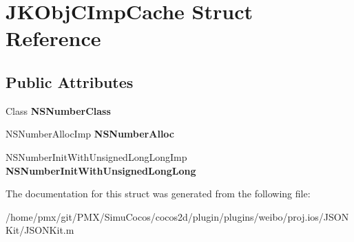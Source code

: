 \hypertarget{structJKObjCImpCache}{}\section{J\+K\+Obj\+C\+Imp\+Cache Struct Reference}
\label{structJKObjCImpCache}
\subsection*{Public Attributes}
\begin{DoxyCompactItemize}
\item 
\mbox{\label{structJKObjCImpCache_a2acfa5579ae2ce93cc41b3370622aac5}} 
Class {\bfseries N\+S\+Number\+Class}
\item 
\mbox{\label{structJKObjCImpCache_a2c83a6491469584a76b8da5672862f9f}} 
N\+S\+Number\+Alloc\+Imp {\bfseries N\+S\+Number\+Alloc}
\item 
\mbox{\label{structJKObjCImpCache_afd030cfda65ff794d562320125fe8ecb}} 
N\+S\+Number\+Init\+With\+Unsigned\+Long\+Long\+Imp {\bfseries N\+S\+Number\+Init\+With\+Unsigned\+Long\+Long}
\end{DoxyCompactItemize}


The documentation for this struct was generated from the following file\+:\begin{DoxyCompactItemize}
\item 
/home/pmx/git/\+P\+M\+X/\+Simu\+Cocos/cocos2d/plugin/plugins/weibo/proj.\+ios/\+J\+S\+O\+N\+Kit/J\+S\+O\+N\+Kit.\+m\end{DoxyCompactItemize}
